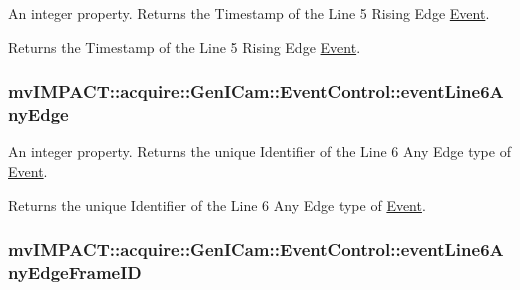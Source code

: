 An integer property. Returns the Timestamp of the Line 5 Rising Edge \hyperlink{classmv_i_m_p_a_c_t_1_1acquire_1_1_event}{Event}. 

Returns the Timestamp of the Line 5 Rising Edge \hyperlink{classmv_i_m_p_a_c_t_1_1acquire_1_1_event}{Event}. \hypertarget{classmv_i_m_p_a_c_t_1_1acquire_1_1_gen_i_cam_1_1_event_control_a131486ed05e1cc3a241adda47383df61}{
\subsubsection[{event\+Line6\+Any\+Edge}]{ mv\+I\+M\+P\+A\+C\+T\+::acquire\+::\+Gen\+I\+Cam\+::\+Event\+Control\+::event\+Line6\+Any\+Edge}}\label{classmv_i_m_p_a_c_t_1_1acquire_1_1_gen_i_cam_1_1_event_control_a131486ed05e1cc3a241adda47383df61}


An integer property. Returns the unique Identifier of the Line 6 Any Edge type of \hyperlink{classmv_i_m_p_a_c_t_1_1acquire_1_1_event}{Event}. 

Returns the unique Identifier of the Line 6 Any Edge type of \hyperlink{classmv_i_m_p_a_c_t_1_1acquire_1_1_event}{Event}. \hypertarget{classmv_i_m_p_a_c_t_1_1acquire_1_1_gen_i_cam_1_1_event_control_a10c633ee42ced09446980728eba1ecb4}{
\subsubsection[{event\+Line6\+Any\+Edge\+Frame\+I\+D}]{ mv\+I\+M\+P\+A\+C\+T\+::acquire\+::\+Gen\+I\+Cam\+::\+Event\+Control\+::event\+Line6\+Any\+Edge\+Frame\+I\+D}}\label{classmv_i_m_p_a_c_t_1_1acquire_1_1_gen_i_cam_1_1_event_control_a10c633ee42ced09446980728eba1ecb4}



